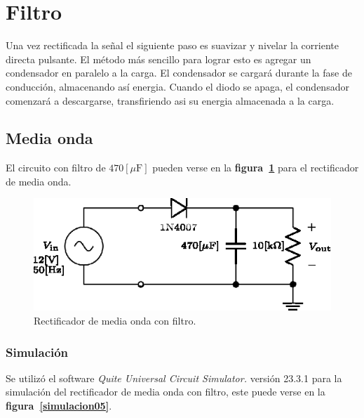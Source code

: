 \section{Filtro}
Una vez rectificada la señal el siguiente paso es suavizar y nivelar la
corriente directa pulsante. El método más sencillo para lograr esto es agregar
un condensador en paralelo a la carga. El condensador se cargará durante la fase
de conducción, almacenando así energia. Cuando el diodo se apaga, el condensador
comenzará a descargarse, transfiriendo asi su energia almacenada a la carga.

\subsection{Media onda}
El circuito con filtro de $470[\mu\text{F}]$ pueden verse en la
\textbf{figura~\ref{circuito05}} para el rectificador de media onda.

\begin{figure}[!h]
\centering
\includegraphics[scale=1]{diagramas/05.media_onda2.eps}
\caption{Rectificador de media onda con filtro.}
\label{circuito05}
\end{figure}

\subsubsection{Simulación}
Se utilizó el software \emph{Quite Universal Circuit Simulator.} versión 23.3.1
para la simulación del rectificador de media onda con filtro, este puede verse
en la \textbf{figura~\ref{simulacion05}}.

